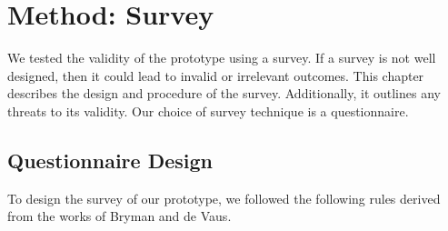 \section{Method: Survey}
\label{section:Method_survey}

We tested the validity of the prototype using a survey.
If a survey is not well designed, then it could lead to invalid or irrelevant outcomes.
This chapter describes the design and procedure of the survey.
Additionally, it outlines any threats to its validity.
Our choice of survey technique is a questionnaire.

\subsection{Questionnaire Design}
To design the survey of our prototype, we followed the following rules derived from the works of Bryman\cite{bryman2016social} and de Vaus\cite{de2013surveys}.

